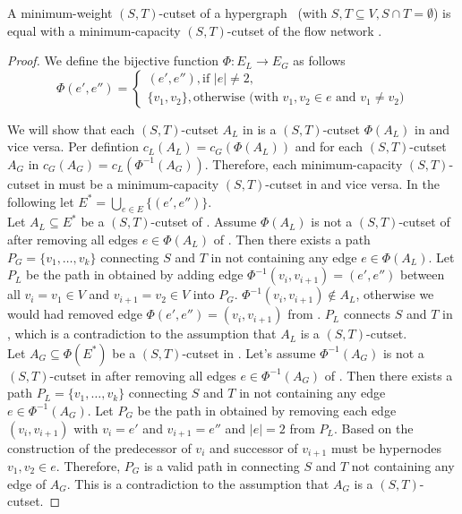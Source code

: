 \begin{theorem}
\label{theorem:st_cutset_equal_graph}
A minimum-weight $(S,T)$-cutset of a hypergraph \HypergraphDef~(with $S,T \subseteq V,
S \cap T = \emptyset$) is equal with a minimum-capacity $(S,T)$-cutset of the
flow network .
\label{theorem:heuer_network}
\end{theorem}

\begin{proof}

We define the bijective function $\Phi: E_L \rightarrow E_G$ as follows
\[ \Phi(e',e'') = 
   \begin{cases}
      (e',e''), \text{if } |e| \neq 2, \\
      \{v_1,v_2\}, \text{otherwise (with $v_1,v_2 \in e$ and $v_1 \neq v_2$)}
   \end{cases} \]

We will show that each $(S,T)$-cutset $A_L$ in  is a $(S,T)$-cutset $\Phi(A_L)$ in
 and vice versa. Per defintion $c_L(A_L) = c_G(\Phi(A_L))$ and for each $(S,T)$-cutset
$A_G$ in  $c_G(A_G) = c_L(\Phi^{-1}(A_G))$. Therefore, each minimum-capacity $(S,T)$-cutset
in  must be a minimum-capacity $(S,T)$-cutset in  and vice versa. In the following 
let $E^* = \bigcup_{e \in E} \{(e',e'')\}$. \\
Let $A_L \subseteq E^*$ be a $(S,T)$-cutset of . Assume $\Phi(A_L)$ is not a $(S,T)$-cutset
of  after removing all edges $e \in \Phi(A_L)$ of . Then there exists a path
$P_G = \{v_1,\ldots,v_k\}$ connecting $S$ and $T$ in  not containing any edge $e \in \Phi(A_L)$.
Let $P_L$ be the path in  obtained by adding edge $\Phi^{-1}(v_i,v_{i+1}) = (e',e'')$ between all
$v_i = v_1 \in V$ and $v_{i+1} = v_2 \in V$ into $P_G$. $\Phi^{-1}(v_i,v_{i+1}) \notin A_L$, otherwise
we would had removed edge $\Phi(e',e'') = (v_i,v_{i+1})$ from . $P_L$ connects $S$ and
$T$ in , which is a contradiction to the assumption that $A_L$ is a $(S,T)$-cutset. \\
Let $A_G \subseteq \Phi(E^*)$ be a $(S,T)$-cutset in . Let's assume $\Phi^{-1}(A_G)$ is not
a $(S,T)$-cutset in  after removing all edges $e \in \Phi^{-1}(A_G)$ of . Then
there exists a path $P_L = \{v_1,\ldots,v_k\}$ connecting $S$ and $T$ in  not containing any
edge $e \in \Phi^{-1}(A_G)$. Let $P_G$ be the path in  obtained by removing each edge
$(v_i,v_{i+1})$ with $v_i = e'$ and $v_{i+1} = e''$ and $|e| = 2$ from $P_L$. Based on the construction
of  the predecessor of $v_i$ and successor of $v_{i+1}$ must be hypernodes $v_1,v_2 \in e$.
Therefore, $P_G$ is a valid path in  connecting $S$ and $T$ not containing any edge of 
$A_G$. This is a contradiction to the assumption that $A_G$ is a $(S,T)$-cutset.
\end{proof}

